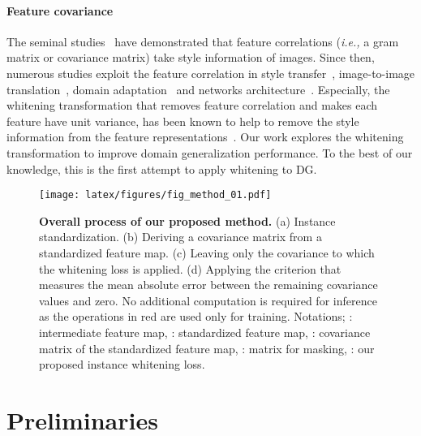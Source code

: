 \documentclass[final]{latex/cvpr}
\begin{document}
\vspace{-0.45cm}
\paragraph{Feature covariance}
The seminal studies~\cite{gatys2015texture,gatys2016image} have demonstrated that feature correlations (\textit{i.e.,} a gram matrix or covariance matrix) take style information of images. Since then, numerous studies exploit the feature correlation in style transfer~\cite{li2017universal}, image-to-image translation~\cite{cho2019image}, domain adaptation~\cite{roy2019unsupervised,sun2016deep} and networks architecture~\cite{luo2017learning,pan2019switchable,huang2018decorrelated,siarohin2018whitening}. Especially, the whitening transformation that removes feature correlation and makes each feature have unit variance, has been known to help to remove the style information from the feature representations~\cite{li2017universal,pan2019switchable,cho2019image}. Our work explores the whitening transformation to improve domain generalization performance. To the best of our knowledge, this is the first attempt to apply whitening to DG.


\begin{figure*}[ht!]
\vspace*{-0.0cm}
  \centering\texttt{[image: latex/figures/fig\_method\_01.pdf]}
  \vspace*{-0.0cm}
  \caption{\textbf{Overall process of our proposed method.} (a) Instance standardization. (b) Deriving a covariance matrix from a standardized feature map. (c) Leaving only the covariance to which the whitening loss is applied. 
  (d) Applying the criterion that measures the mean absolute error between the remaining covariance values and zero. No additional computation is required for inference as the operations in red are used only for training.
  Notations; : intermediate feature map, : standardized feature map, : covariance matrix of the standardized feature map, : matrix for masking, : our proposed instance whitening loss.
}
\label{fig:whitening_overview}
\vspace*{-0.4cm}
\end{figure*}


\vspace*{-0.05cm}
\section{Preliminaries}
\vspace*{-0.1cm}
\end{document}
